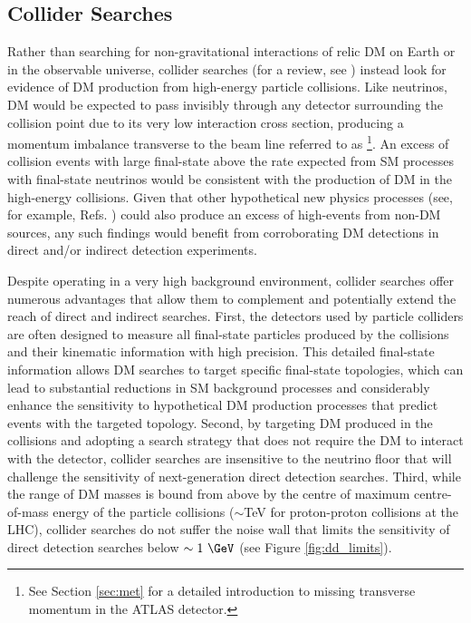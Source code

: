 \subsection{Collider Searches}

Rather than searching for non-gravitational interactions of relic DM on Earth or in the observable universe, collider searches (for a review, see \cite{DM_colliders}) instead look for evidence of DM production from high-energy particle collisions. Like neutrinos, DM would be expected to pass invisibly through any detector surrounding the collision point due to its very low interaction cross section, producing a momentum imbalance transverse to the beam line referred to as \met\footnote{See Section \ref{sec:met} for a detailed introduction to missing transverse momentum in the ATLAS detector.}. An excess of collision events with large final-state \met above the rate expected from SM processes with final-state neutrinos would be consistent with the production of DM in the high-energy collisions. Given that other hypothetical new physics processes (see, for example, Refs. \cite{add_1998, dark_energy_lhc}) could also produce an excess of high-\met events from non-DM sources, any such findings would benefit from corroborating DM detections in direct and/or indirect detection experiments.

Despite operating in a very high background environment, collider searches offer numerous advantages that allow them to complement and potentially extend the reach of direct and indirect searches. First, the detectors used by particle colliders are often designed to measure all final-state particles produced by the collisions and their kinematic information with high precision. This detailed final-state information allows DM searches to target specific final-state topologies, which can lead to substantial reductions in SM background processes and considerably enhance the sensitivity to hypothetical DM production processes that predict events with the targeted topology. Second, by targeting DM produced in the collisions and adopting a search strategy that does not require the DM to interact with the detector, collider searches are insensitive to the neutrino floor that will challenge the sensitivity of next-generation direct detection searches. Third, while the range of DM masses is bound from above by the centre of maximum centre-of-mass energy of the particle collisions (\(\sim\)TeV for proton-proton collisions at the LHC), collider searches do not suffer the noise wall that limits the sensitivity of direct detection searches below \(\sim1~\GeV\) (see Figure \ref{fig:dd_limits}).

